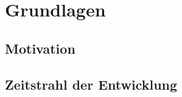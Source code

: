 \chapter{Grundlagen}
\lipsum

\section{Motivation}
\lipsum

\cite{Knuth:1998:ACP:280635}

\section{Zeitstrahl der Entwicklung}
